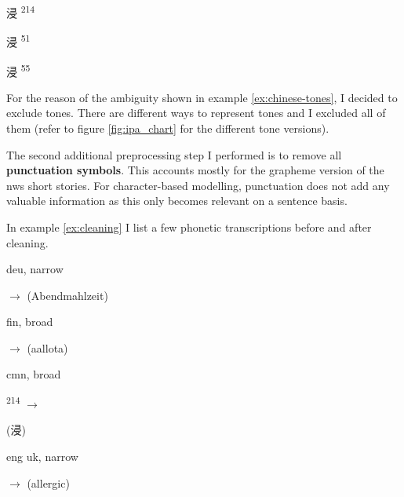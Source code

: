 \begin{covsubexamples}
\label{ex:chinese-tones}
\item 
\begin{CJK*}{UTF8}{bsmi}
浸 \>\>\>\> \textsuperscript{2}\textsuperscript{1}\textsuperscript{4}
\end{CJK*}
\item 
\begin{CJK*}{UTF8}{bsmi}
浸 \>\>\>\> \textsuperscript{5}\textsuperscript{1}
\end{CJK*}
\item  
\begin{CJK*}{UTF8}{bsmi}
浸 \>\>\>\> \textsuperscript{5}\textsuperscript{5}
\end{CJK*}
\end{covsubexamples}

For the reason of the ambiguity shown in example \ref{ex:chinese-tones}, I decided to exclude tones. There are different ways to represent tones and I excluded all of them (refer to figure \ref{fig:ipa_chart} for the different tone versions). 

The second additional preprocessing step I performed is to remove all \textbf{punctuation symbols}. This accounts mostly for the grapheme version of the \ac{nws} short stories. For character-based modelling, punctuation does not add any valuable information as this only becomes relevant on a sentence basis. 

In example \ref{ex:cleaning} I list a few phonetic transcriptions before and after cleaning. 

\begin{covsubexamples}[preamble={This example shows stringe before and after cleaning them. The left-hand side of the arrows shows the uncleaned version and the right-hand side the cleaned version. I added the language code and the transcription type and the original grapheme sequence in parentheses.}]
\label{ex:cleaning}
\item deu, narrow

 $\rightarrow$  (Abendmahlzeit)
\item fin, broad

  $\rightarrow$  (aallota)
\item cmn, broad

 \textsuperscript{2}\textsuperscript{1}\textsuperscript{4} $\rightarrow$ 
\begin{CJK*}{UTF8}{bsmi}
(浸)
\end{CJK*}
\item eng uk, narrow

 $\rightarrow$  (allergic)
\end{covsubexamples}

